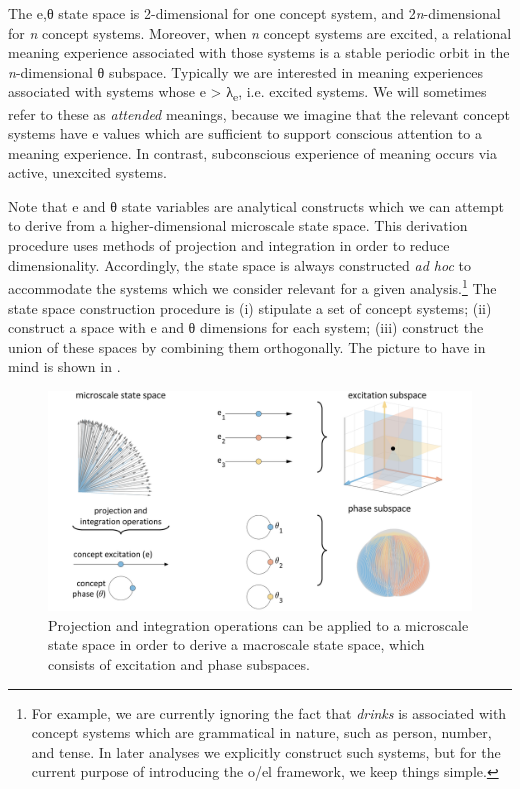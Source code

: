   The e,θ state space is 2-dimensional for one concept system, and 2\textit{n}{}-dimensional for \textit{n} concept systems. Moreover, when \textit{n} concept systems are excited, a relational meaning experience associated with those systems is a stable periodic orbit in the \textit{n}{}-dimensional θ subspace. Typically we are interested in meaning experiences associated with systems whose e > λ\textsubscript{e}, i.e. excited systems. We will sometimes refer to these as \textit{attended} meanings, because we imagine that the relevant concept systems have e values which are sufficient to support conscious attention to a meaning experience. In contrast, subconscious experience of meaning occurs via active, unexcited systems.

  Note that e and θ state variables are analytical constructs which we can attempt to derive from a higher-dimensional microscale state space. This derivation procedure uses methods of projection and integration in order to reduce dimensionality. Accordingly, the state space is always constructed \textit{ad hoc} to accommodate the systems which we consider relevant for a given analysis.\footnote{For example, we are currently ignoring the fact that \textit{drinks} is associated with concept systems which are grammatical in nature, such as person, number, and tense. In later analyses we explicitly construct such systems, but for the current purpose of introducing the o/el framework, we keep things simple.} The state space construction procedure is (i) stipulate a set of concept systems; (ii) construct a space with e and θ dimensions for each system; (iii) construct the union of these spaces by combining them orthogonally. The picture to have in mind is shown in {}. 

  
\begin{figure}
\includegraphics[width=\textwidth]{figures/Tilsen-img14.png}
\caption{Projection and integration operations can be applied to a microscale state space in order to derive a macroscale state space, which consists of excitation and phase subspaces.}
\label{fig:2:7}
\end{figure}
 

